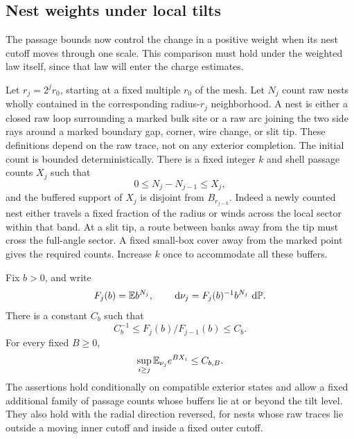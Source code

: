 \subsection{Nest weights under local tilts}

The passage bounds now control the change in a positive weight when its
nest cutoff moves through one scale.  This comparison must hold under
the weighted law itself, since that law will enter the charge estimates.

Let \(r_j=2^jr_0\), starting at a fixed multiple \(r_0\) of the
mesh.  Let \(N_j\) count raw nests wholly contained in the
corresponding radius-\(r_j\) neighborhood.  A nest is either a
closed raw loop surrounding a marked bulk site or a raw arc
joining the two side rays around a marked boundary gap, corner,
wire change, or slit tip.  These definitions depend on the raw
trace, not on any exterior completion.  The initial count is
bounded deterministically.  There is a fixed integer \(k\) and
shell passage counts \(X_j\) such that
\begin{equation}\label{angular:nest-increments}
 0\le N_j-N_{j-1}\le X_j,
\end{equation}
and the buffered support of \(X_j\) is disjoint from
\(B_{r_{j-k}}\).  Indeed a newly counted nest either travels a
fixed fraction of the radius or winds across the local sector
within that band.  At a slit tip, a route between banks away from
the tip must cross the full-angle sector.  A fixed small-box
cover away from the marked point gives the required counts.
Increase \(k\) once to accommodate all these buffers.

\begin{proposition}\label{prop:tilts}
Fix \(b>0\), and write
\[
 F_j(b)=\mathbb E b^{N_j},\qquad
 \,\mathrm d\nu_j=F_j(b)^{-1}b^{N_j}\,\,\mathrm d\mathbb P.
\]
There is a constant \(C_b\) such that
\begin{equation}\label{angular:tilt-ratios}
 C_b^{-1}\le F_j(b)/F_{j-1}(b)\le C_b .
\end{equation}
For every fixed \(B\ge0\),
\begin{equation}\label{angular:tilt-moments}
 \sup_{i\ge j}\mathbb E_{\nu_j}e^{BX_i}\le C_{b,B}.
\end{equation}
The assertions hold conditionally on compatible exterior states
and allow a fixed additional family of passage counts whose
buffers lie at or beyond the tilt level.  They also hold with
the radial direction reversed, for nests whose raw traces lie
outside a moving inner cutoff and inside a fixed outer cutoff.
\end{proposition}

